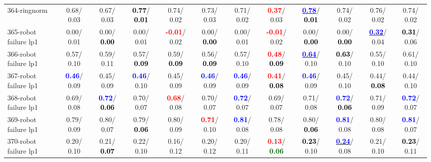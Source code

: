\begin{table}[h]
\begin{center}
{\begin{tabular}{lc|c|c|c|c|c|c|c|c|c|c}
364-ringnorm &   0.68/  0.03 &   0.67/  0.03 & \textcolor{black}{\textbf{  0.77}}/\textcolor{black}{\textbf{  0.01}} &   0.74/  0.02 &   0.73/  0.03 &   0.71/  0.02 & \textcolor{red}{\textbf{  0.37}}/  0.03 & \underline{\textcolor{blue}{\textbf{  0.78}}}/\textcolor{black}{\textbf{  0.01}} &   0.74/  0.02 &   0.76/  0.02 &   0.74/  0.02 \\
365-robot failure lp1 &   0.00/  0.01 &   0.00/\textcolor{black}{\textbf{  0.00}} &   0.00/  0.01 & \textcolor{red}{\textbf{ -0.01}}/  0.02 &   0.00/\textcolor{black}{\textbf{  0.00}} &   0.00/  0.01 & \textcolor{red}{\textbf{ -0.01}}/  0.02 &   0.00/\textcolor{black}{\textbf{  0.00}} &   0.00/\textcolor{black}{\textbf{  0.00}} & \underline{\textcolor{blue}{\textbf{  0.32}}}/  0.04 & \textcolor{black}{\textbf{  0.31}}/  0.06 \\
366-robot failure lp1 &   0.57/  0.10 &   0.59/  0.11 &   0.57/\textcolor{black}{\textbf{  0.09}} &   0.59/\textcolor{black}{\textbf{  0.09}} &   0.56/\textcolor{black}{\textbf{  0.09}} &   0.57/  0.10 & \textcolor{red}{\textbf{  0.48}}/\textcolor{black}{\textbf{  0.09}} & \underline{\textcolor{blue}{\textbf{  0.64}}}/  0.10 & \textcolor{black}{\textbf{  0.63}}/  0.10 &   0.55/  0.10 &   0.61/  0.10 \\ \hline
367-robot failure lp1 & \textcolor{blue}{\textbf{  0.46}}/  0.09 &   0.45/  0.09 & \textcolor{blue}{\textbf{  0.46}}/  0.10 &   0.45/  0.09 & \textcolor{blue}{\textbf{  0.46}}/  0.09 & \textcolor{blue}{\textbf{  0.46}}/  0.09 & \textcolor{red}{\textbf{  0.41}}/\textcolor{black}{\textbf{  0.08}} & \textcolor{blue}{\textbf{  0.46}}/  0.09 &   0.45/  0.10 &   0.44/\textcolor{black}{\textbf{  0.08}} &   0.44/  0.10 \\
368-robot failure lp1 &   0.69/  0.08 & \textcolor{blue}{\textbf{  0.72}}/\textcolor{black}{\textbf{  0.06}} &   0.70/  0.07 & \textcolor{red}{\textbf{  0.68}}/  0.08 &   0.70/  0.07 & \textcolor{blue}{\textbf{  0.72}}/  0.07 &   0.69/  0.07 &   0.71/  0.08 & \textcolor{blue}{\textbf{  0.72}}/\textcolor{black}{\textbf{  0.06}} &   0.71/  0.09 & \textcolor{blue}{\textbf{  0.72}}/  0.07 \\
369-robot failure lp1 &   0.79/  0.09 &   0.80/  0.07 &   0.79/\textcolor{black}{\textbf{  0.06}} &   0.80/  0.09 & \textcolor{red}{\textbf{  0.71}}/  0.10 & \textcolor{blue}{\textbf{  0.81}}/  0.08 &   0.78/  0.08 &   0.80/\textcolor{black}{\textbf{  0.06}} & \textcolor{blue}{\textbf{  0.81}}/  0.08 &   0.80/  0.08 & \textcolor{blue}{\textbf{  0.81}}/  0.07 \\
370-robot failure lp1 &   0.20/  0.10 &   0.21/\textcolor{black}{\textbf{  0.07}} &   0.22/  0.10 &   0.16/  0.12 &   0.20/  0.12 &   0.20/  0.11 & \textcolor{red}{\textbf{  0.13}}/\textcolor{darkgreen}{\textbf{  0.06}} & \textcolor{black}{\textbf{  0.23}}/  0.10 & \underline{\textcolor{blue}{\textbf{  0.24}}}/  0.08 &   0.21/  0.10 & \textcolor{black}{\textbf{  0.23}}/  0.11 \\

\end{tabular}}
\end{center}
\end{table}
